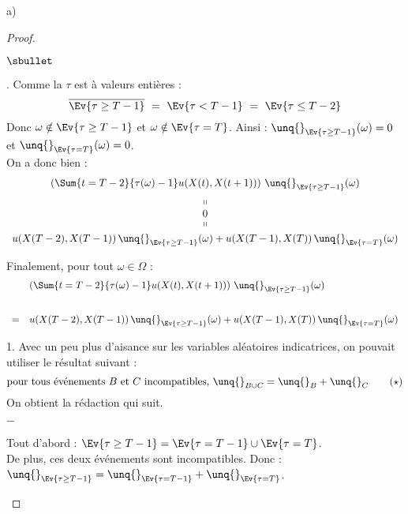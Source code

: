 \begin{noliste}{a)}
\begin{proof}
\begin{noliste}{$\sbullet$}
        
        \item {}. Comme la \var $\tau$ est à valeurs entières :
	\[
	  \overline{\Ev{\tau \geq T-1}} \ = \ \Ev{\tau < T-1} \ = \
	  \Ev{\tau \leq T-2}
	\]
	Donc $\omega \notin \Ev{\tau \geq T-1}$ et $\omega \notin 
	\Ev{\tau =T}$.
	Ainsi : $\unq{}_{\Ev{\tau \geq T-1}}(\omega)=0$ et 
	$\unq{}_{\Ev{\tau=T}}(\omega)=0$.\\
	On a donc bien :
	\[
	  \begin{array}{c}
	    \left( \Sum{t=T-2}{\tau(\omega)-1} u(X(t),X(t+1))\right) 
	    \, \unq{}_{\Ev{\tau \geq T-1}}(\omega)
	    \\[.2cm]
	    \shortparallel
	    \\
	    0
	    \\[-.1cm]
	    \shortparallel
	    \\[.1cm]
	    u(X(T-2),X(T-1)) \, \unq{}_{\Ev{\tau \geq T-1}}(\omega)
	    + u(X(T-1),X(T)) \, \unq{}_{\Ev{\tau =T}}(\omega)
	  \end{array}
	\]
      \end{noliste}
      Finalement, pour tout $\omega \in \Omega$ :
      \[
        \begin{array}{cl}
          & \left( \Sum{t=T-2}{\tau(\omega)-1} u(X(t),X(t+1))\right) \,
          \unq{}_{\Ev{\tau \geq T-1}}(\omega)
          \\[.8cm]
          =& u(X(T-2),X(T-1)) \, \unq{}_{\Ev{\tau \geq T-1}}(\omega)
          + u(X(T-1),X(T)) \, \unq{}_{\Ev{\tau =T}}(\omega)
        \end{array}
      \]
      
      \begin{remarkL}{1.}
      Avec un peu plus d'aisance sur les variables aléatoires 
        indicatrices, on pouvait utiliser le résultat suivant :
        \[
          \text{pour tous événements $B$ et $C$ incompatibles, 
          $\unq{}_{B \cup C} = \unq{}_B + \unq{}_C$} \qquad (\star)
        \]
        On obtient la rédaction qui suit.
        \begin{noliste}{$-$}
	  \item Tout d'abord : $\Ev{\tau \geq T-1} = \Ev{\tau = T-1}
	  \cup \Ev{\tau =T}$.\\
	  De plus, ces deux événements sont incompatibles. Donc : 
	  $\unq{}_{\Ev{\tau \geq T-1}} = \unq{}_{\Ev{\tau =T-1}} + 
	  \unq{}_{\Ev{\tau =T}}$.
	  

\end{noliste}
\end{remarkL}
\end{proof}
\end{noliste}
